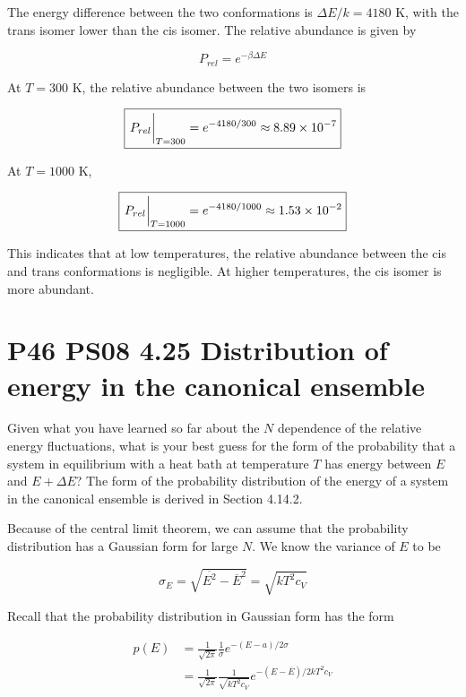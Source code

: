 \documentclass[9pt,a4paper,twocolumn]{article}
\begin{document}
The energy difference between the two conformations is $\Delta E/k = 4180$ K, with the trans isomer lower than the cis isomer. The relative abundance is given by

\begin{equation}
	P_{rel} = e^{-\beta\Delta E} \label{eq:given-prel}
\end{equation}

At $T = 300$ K, the relative abundance between the two isomers is

\begin{equation}
	\boxed{
		\eval{P_{rel}}_{T=300} = e^{-4180/300} \approx  8.89 \times 10^{-7}
	}
\end{equation}

At $T = 1000$ K,

\begin{equation}
	\boxed{
		\eval{P_{rel}}_{T=1000} = e^{-4180/1000} \approx 1.53 \times 10^{-2}
	}
\end{equation}

This indicates that at low temperatures, the relative abundance between the cis and trans conformations is negligible. At higher temperatures, the cis isomer is more abundant.

\section{P46 PS08 4.25 Distribution of energy in the canonical ensemble}
Given what you have learned so far about the $N$ dependence of the relative energy fluctuations, what is your best guess for the form of the probability that a system in equilibrium with a heat bath at temperature $T$ has energy between $E$ and $E + \Delta E$? The form of the probability distribution of the energy of a system in the canonical ensemble is derived in Section 4.14.2.

Because of the central limit theorem, we can assume that the probability distribution has a Gaussian form for large $N$. We know the variance of $E$ to be

\begin{equation}
	\sigma_E = \sqrt{\overline{E^2} - \overline{E}^2} = \sqrt{kT^2 c_V}
\end{equation}

Recall that the probability distribution in Gaussian form has the form

\begin{align}
	p(E) &= \frac{1}{\sqrt{2\pi}}\frac{1}{\sigma} e^{-(E-a)/2\sigma} \\
	&= \frac{1}{\sqrt{2\pi}}\frac{1}{\sqrt{kT^2 c_V}} e^{-(E - \overline{E})/2kT^2c_V}
\end{align}
\end{document}
